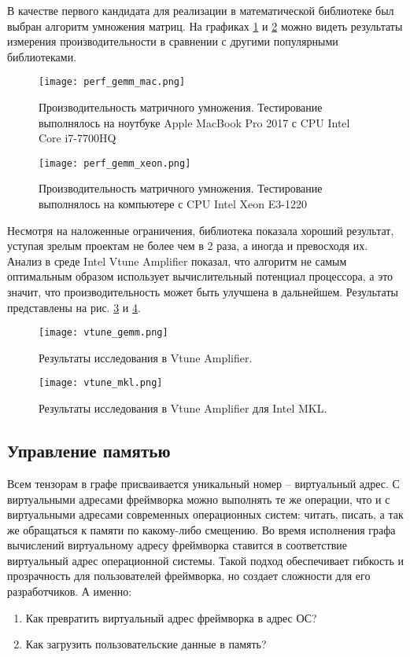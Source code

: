 В качестве первого кандидата для реализации в математической библиотеке был
выбран алгоритм умножения матриц. На графиках \ref{fig:perf_gemm_mac} и \ref{fig:perf_gemm_xeon} можно видеть результаты
измерения производительности в сравнении с другими популярными библиотеками.

\begin{figure}[h]
    \centering
    \texttt{[image: perf\_gemm\_mac.png]}
    \caption{Производительность матричного умножения. Тестирование выполнялось на ноутбуке Apple MacBook Pro 2017 с CPU Intel Core i7-7700HQ}
    \label{fig:perf_gemm_mac}
\end{figure}

\begin{figure}[h]
    \centering
    \texttt{[image: perf\_gemm\_xeon.png]}
    \caption{Производительность матричного умножения. Тестирование выполнялось на компьютере с CPU
    Intel Xeon E3-1220}
    \label{fig:perf_gemm_xeon}
\end{figure}

Несмотря на наложенные ограничения, библиотека показала хороший результат, уступая
зрелым проектам не более чем в 2 раза, а иногда и превосходя их. Анализ в среде
Intel Vtune Amplifier показал, что алгоритм не самым оптимальным образом использует
вычислительный потенциал процессора, а это значит, что производительность может быть улучшена
в дальнейшем. Результаты представлены на рис. \ref{fig:vtune_gemm} и \ref{fig:vtune_mkl}.

\begin{figure}[h]
    \centering
    \texttt{[image: vtune\_gemm.png]}
    \caption{Результаты исследования в Vtune Amplifier.}
    \label{fig:vtune_gemm}
\end{figure}
\begin{figure}[h]
    \centering
    \texttt{[image: vtune\_mkl.png]}
    \caption{Результаты исследования в Vtune Amplifier для Intel MKL.}
    \label{fig:vtune_mkl}
\end{figure}
\subsection{Управление памятью}

Всем тензорам в графе присваивается уникальный номер -- виртуальный адрес.
С виртуальными адресами фреймворка можно выполнять те же операции, что и с
виртуальными адресами современных операционных систем: читать, писать, а так
же обращаться к памяти по какому-либо смещению. Во время исполнения графа
вычислений виртуальному адресу фреймворка ставится в соответствие виртуальный
адрес операционной системы. Такой подход обеспечивает гибкость и прозрачность
для пользователей фреймворка, но создает сложности для его разработчиков.
А именно:
\begin{enumerate}
    \item Как превратить виртуальный адрес фреймворка в адрес ОС?
    \item Как загрузить пользовательские данные в память?
\end{enumerate}

